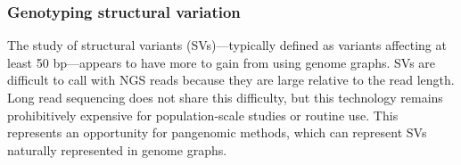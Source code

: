 %
%
%

\subsubsection{Genotyping structural variation}

The study of structural variants (SVs)---typically defined as variants affecting at least 50 bp---appears to have more to gain from using genome graphs.
SVs are difficult to call with NGS reads because they are large relative to the read length.
Long read sequencing does not share this difficulty, but this technology remains prohibitively expensive for population-scale studies or routine use.
This represents an opportunity for pangenomic methods, which can represent SVs naturally represented in genome graphs.

